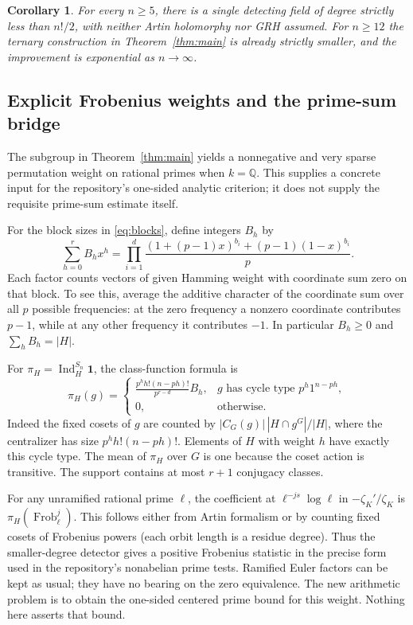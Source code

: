 \documentclass[11pt]{article}
\newtheorem{corollary}[theorem]{Corollary}
\theoremstyle{remark}\newtheorem{remark}[theorem]{Remark}
\newcommand{\Ind}{\operatorname{Ind}}
\newcommand{\Q}{\mathbb Q}
\newcommand{\one}{\mathbf{1}}
\begin{document}
\begin{corollary}\label{cor:answer}
For every $n\ge5$, there is a \emph{single} detecting field of degree strictly less than $n!/2$, with neither Artin holomorphy nor GRH assumed. For $n\ge12$ the ternary construction in Theorem~\ref{thm:main} is already strictly smaller, and the improvement is exponential as $n\to\infty$.
\end{corollary}

\subsection{Explicit Frobenius weights and the prime-sum bridge}
The subgroup in Theorem~\ref{thm:main} yields a nonnegative and very sparse permutation weight on rational primes when $k=\Q$. This supplies a concrete input for the repository's one-sided analytic criterion; it does not supply the requisite prime-sum estimate itself.

For the block sizes in \eqref{eq:blocks}, define integers $B_h$ by
\begin{equation}\label{eq:weightH}
 \sum_{h=0}^r B_hx^h=\prod_{i=1}^d\frac{(1+(p-1)x)^{b_i}+(p-1)(1-x)^{b_i}}p.
\end{equation}
Each factor counts vectors of given Hamming weight with coordinate sum zero on that block. To see this, average the additive character of the coordinate sum over all $p$ possible frequencies: at the zero frequency a nonzero coordinate contributes $p-1$, while at any other frequency it contributes $-1$. In particular $B_h\ge0$ and $\sum_h B_h=|H|$.

For $\pi_H=\Ind_H^{S_n}\one$, the class-function formula is
\begin{equation}\label{eq:frob}
 \pi_H(g)=\begin{cases}
 \displaystyle\frac{p^h h!(n-ph)!}{p^{r-d}}B_h,&g\text{ has cycle type }p^h1^{n-ph},\\[4pt]
 0,&\text{otherwise}.
 \end{cases}
\end{equation}
Indeed the fixed cosets of $g$ are counted by $|C_G(g)|\,|H\cap g^G|/|H|$, where the centralizer has size $p^h h!(n-ph)!$. Elements of $H$ with weight $h$ have exactly this cycle type. The mean of $\pi_H$ over $G$ is one because the coset action is transitive. The support contains at most $r+1$ conjugacy classes.

For any unramified rational prime $\ell$, the coefficient at $\ell^{-js}\log\ell$ in $-\zeta_K'/\zeta_K$ is $\pi_H(\operatorname{Frob}_\ell^j)$. This follows either from Artin formalism or by counting fixed cosets of Frobenius powers (each orbit length is a residue degree). Thus the smaller-degree detector gives a positive Frobenius statistic in the precise form used in the repository's nonabelian prime tests. Ramified Euler factors can be kept as usual; they have no bearing on the zero equivalence. The new arithmetic problem is to obtain the one-sided centered prime bound for this weight. Nothing here asserts that bound.
\end{document}
